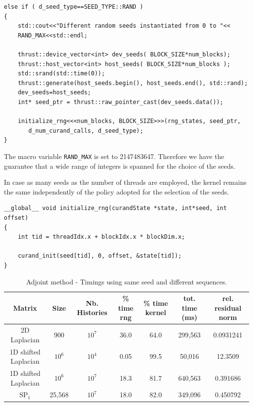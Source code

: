 \documentclass[a4paper,10pt]{article}
\begin{document}
\begin{enumerate}
\hspace*{-2cm}
\begin{lstlisting}
else if ( d_seed_type==SEED_TYPE::RAND )
{
    std::cout<<"Different random seeds instantiated from 0 to "<<
    RAND_MAX<<std::endl;

    thrust::device_vector<int> dev_seeds( BLOCK_SIZE*num_blocks);
    thrust::host_vector<int> host_seeds( BLOCK_SIZE*num_blocks );
    std::srand(std::time(0));
    thrust::generate(host_seeds.begin(), host_seeds.end(), std::rand);
    dev_seeds=host_seeds;
    int* seed_ptr = thrust::raw_pointer_cast(dev_seeds.data());

    initialize_rng<<<num_blocks, BLOCK_SIZE>>>(rng_states, seed_ptr,
       d_num_curand_calls, d_seed_type);
}

\end{lstlisting}

The macro variable \texttt{RAND\_MAX} is set to 2147483647. Therefore 
we have the guarantee that a wide range of integers is spanned for the choice 
of the seeds.

In case as many seeds as the number of threads are 
employed, the kernel remains the same independently of the policy adopted for 
the selection of the seeds.

\hspace*{-2cm}
\begin{lstlisting}
__global__ void initialize_rng(curandState *state, int*seed, int offset)
{
    int tid = threadIdx.x + blockIdx.x * blockDim.x;

    curand_init(seed[tid], 0, offset, &state[tid]);
}
\end{lstlisting}
\end{enumerate}

\begin{table}[!h]
\hspace*{-2cm}
\begin{tabular}{|c|c|c|c|c|c|c|}
\hline
\textbf{Matrix} & \textbf{Size} &\textbf{Nb. Histories} & \textbf{\% time rng} 
& \textbf{\% time kernel} & tot. time (ms)& rel. residual norm\\
\hline
2D Laplacian& 900 & $10^7$ & 36.0 & 64.0 & 299,563 & 0.0931241 \\
\hline 
1D shifted Laplacian& $10^6$ & $10^4$ & 0.05 & 99.5 & 50,016 & 12.3509\\
\hline
1D shifted Laplacian& $10^6$ & $10^7$ & 18.3 & 81.7 & 640,563 & 0.391686 \\
\hline
$\text{SP}_1$ & 25,568 & $10^7$ & 18.0 & 82.0 & 349,096 & 0.450792 \\
\hline
\end{tabular}
\caption{Adjoint method - Timings using same seed and different sequences.} 
\label{tab1}
\end{table}
\end{document}

